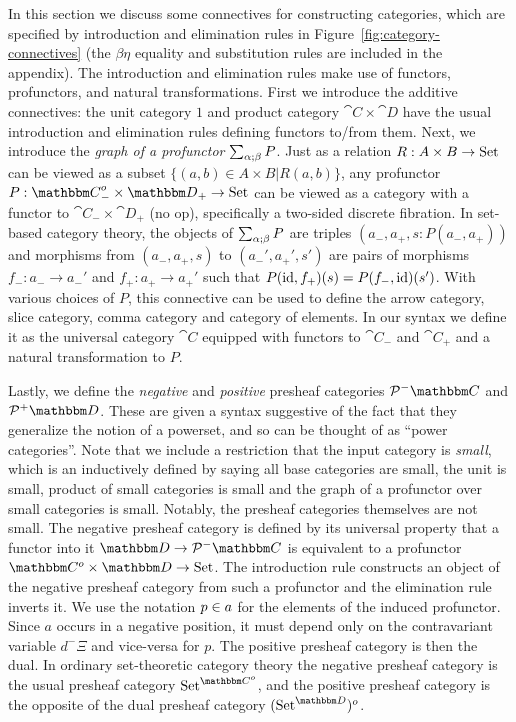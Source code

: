 \documentclass{llncs}
\begin{document}
In this section we discuss some connectives for constructing categories,
which are specified by introduction and elimination rules in
Figure~\ref{fig:category-connectives} (the $\beta\eta$ equality and
substitution rules are included in the appendix).  The introduction and
elimination rules make use of functors, profunctors, and natural
transformations.
%
First we introduce the additive connectives: the unit category $1$ and
product category $\cat C \times \cat D$ have the usual introduction
and elimination rules defining functors to/from them.
%
Next, we introduce the \emph{graph of a profunctor} $\graphProf \alpha
\beta P$. Just as a relation $R : A \times B \to \Set$ can be viewed
as a subset $\{ (a,b) \in A\times B | R(a,b)\}$, any profunctor $P :
{\cat C}_-^o\times {\cat D}_+ \to \Set$ can be viewed as a category with a functor
to ${\cat C}_- \times {\cat D}_+$ (no op), specifically a two-sided discrete
fibration. In set-based category theory, the objects of $\graphProf \alpha
\beta P$ are triples
$(a_-, a_+, s : P(a_-,a_+))$ and morphisms from $(a_-,a_+, s)$ to
$(a_-',a_+', s')$ are pairs of morphisms $f_- : a_- \to a_-'$ and $f_+
: a_+ \to a_+'$ such that $P(\id,f_+)(s) = P(f_-,\id)(s')$.
%
With various choices of $P$, this connective can be used to define the
arrow category, slice category, comma category and category of
elements.
%
In our syntax we define it as the universal category $\cat C$ equipped
with functors to $\cat C_-$ and $\cat C_+$ and a natural transformation to $P$.

Lastly, we define the \emph{negative} and \emph{positive} presheaf
categories $\negPresheaf \cat C$ and $\posPresheaf \cat D$. These are
given a syntax suggestive of the fact that they generalize the notion
of a powerset, and so can be thought of as ``power categories''.
%
Note that we include a restriction that the input category is
\emph{small}, which is an inductively defined by saying all base
categories are small, the unit is small, product of small categories
is small and the graph of a profunctor over small categories is
small. Notably, the presheaf categories themselves are not small.
%
The negative presheaf category is defined by its universal property
that a functor into it $\cat D \to \negPresheaf \cat C$ is equivalent
to a profunctor $\cat C^o \times \cat D \to \Set$.
%
The introduction rule constructs an object of the negative presheaf
category from such a profunctor and the elimination rule inverts
it. We use the notation $\negPresheafApp a p$ for the elements of the
induced profunctor. Since $a$ occurs in a negative position, it must
depend only on the contravariant variable $d^-\Xi$ and vice-versa for
$p$.
%
The positive presheaf category is then the dual. In ordinary
set-theoretic category theory the negative presheaf category is the
usual presheaf category $\Set^{\cat C^o}$, and the positive presheaf
category is the opposite of the dual presheaf category $(\Set^{\cat
  D})^o$.
\end{document}
